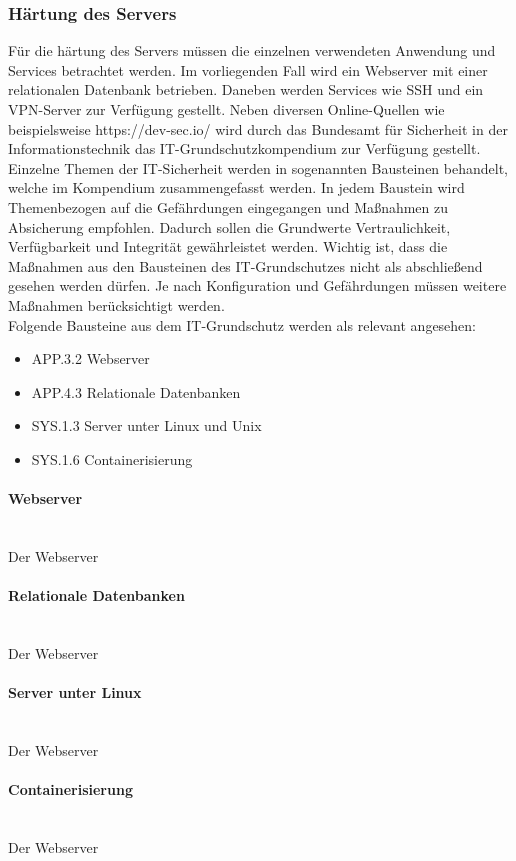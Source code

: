 \newpage
\subsubsection{H\"artung des Servers}

F\"ur die h\"artung des Servers m\"ussen die einzelnen verwendeten Anwendung und Services betrachtet werden. Im vorliegenden Fall wird ein Webserver mit einer relationalen Datenbank betrieben. Daneben werden Services wie SSH und ein VPN-Server zur Verf\"ugung gestellt. Neben diversen Online-Quellen wie beispielsweise https://dev-sec.io/ wird durch das Bundesamt f\"ur Sicherheit in der Informationstechnik das IT-Grundschutzkompendium zur Verf\"ugung gestellt. Einzelne Themen der IT-Sicherheit werden in sogenannten Bausteinen behandelt, welche im Kompendium zusammengefasst werden. In jedem Baustein wird Themenbezogen auf die Gef\"ahrdungen eingegangen und Ma{\ss}nahmen zu Absicherung empfohlen. Dadurch sollen die Grundwerte Vertraulichkeit, Verf\"ugbarkeit und Integrit\"at gew\"ahrleistet werden. Wichtig ist, dass die Ma{\ss}nahmen aus den Bausteinen des IT-Grundschutzes nicht als abschlie{\ss}end gesehen werden d\"urfen. Je nach Konfiguration und Gef\"ahrdungen m\"ussen weitere Ma{\ss}nahmen ber\"ucksichtigt werden. \\

Folgende Bausteine aus dem IT-Grundschutz werden als relevant angesehen:
  \begin{itemize}
      \item APP.3.2 Webserver
			\item APP.4.3 Relationale Datenbanken
      \item SYS.1.3 Server unter Linux und Unix
			\item SYS.1.6 Containerisierung
   \end{itemize} 

\paragraph{Webserver}
\noindent \\Der Webserver  

\paragraph{Relationale Datenbanken}
\noindent \\Der Webserver  

\paragraph{Server unter Linux}
\noindent \\Der Webserver  

\paragraph{Containerisierung}
\noindent \\Der Webserver  